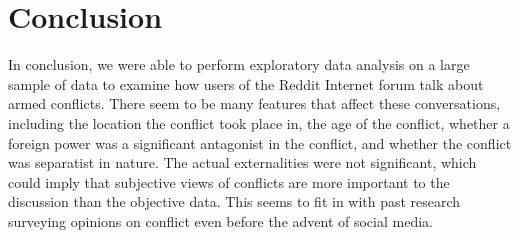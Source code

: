 \section{Conclusion}
In conclusion, we were able to perform exploratory data analysis on a large sample of data to examine how users of the Reddit Internet forum talk about armed conflicts. There seem to be many features that affect these conversations, including the location the conflict took place in, the age of the conflict, whether a foreign power was a significant antagonist in the conflict, and whether the conflict was separatist in nature. The actual externalities were not significant, which could imply that subjective views of conflicts are more important to the discussion than the objective data. This seems to fit in with past research surveying opinions on conflict even before the advent of social media.  